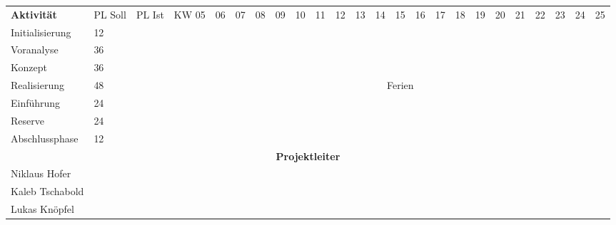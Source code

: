 \documentclass[10pt,paper=a4,final]{scrartcl}
\begin{document}
\begin{landscape}
\begin{tabularx}{\textwidth}{ |p{4.0cm}|l|l|l|l|l|l|l|l|l|l|l|l|l|l|l|l|l|l|l|l|l|l|l| }
\cline{1-24}	%
\bf Aktivit\"at & PL Soll & PL Ist & KW 05 & 06 & 07 & 08 & 09 & 10 & 11 & 12 & 13 & 14 & 15 & 16 & 17 & 18 & 19 & 20 & 21 & 22 & 23 & 24 & 25 \\
\cline{1-24}
Initialisierung & 12 & & & \cellcolor[gray]{0.7} & & & & & & & & & & & & & & & & & & & \\
\cline{1-24}
Voranalyse & 36 & & & & \cellcolor[gray]{0.7} & \cellcolor[gray]{0.7} & \cellcolor[gray]{0.7} & & & & & & & & & & & & & & & & \\
\cline{1-24}
Konzept & 36 & & & & & & & \cellcolor[gray]{0.7} & \cellcolor[gray]{0.7} & \cellcolor[gray]{0.7} & & & & & & & & & & & & & \\
\cline{1-24}
Realisierung & 48 & & & & & & & & & & \cellcolor[gray]{0.7} & \multicolumn{3}{|c|}{Ferien \cellcolor{green!70!}} & \cellcolor[gray]{0.7} & \cellcolor[gray]{0.7} & \cellcolor[gray]{0.7} & & & & & & \\
\cline{1-24}
Einf\"uhrung & 24 & & & & & & & & & & & & & & & & & \cellcolor[gray]{0.7} & \cellcolor[gray]{0.7} & & & & \\
\cline{1-24}
Reserve & 24 & & & & & & & & & & & & & & & & & & & \cellcolor[gray]{0.7} & \cellcolor[gray]{0.7} & & \\
\cline{1-24}
Abschlussphase & 12 & & & & & & & & & & & & & & & & & & & & & \cellcolor[gray]{0.7} & \cellcolor[gray]{0.7}\\
\cline{1-24}
\multicolumn{24}{|c|}{\bf Projektleiter} \\
\cline{1-24}
Niklaus Hofer & & & \cellcolor[gray]{0.7} & \cellcolor[gray]{0.7} & \cellcolor[gray]{0.7} & \cellcolor[gray]{0.7} & \cellcolor[gray]{0.7} & & & & & & & & & & & & & & & & \\
\cline{1-24}
Kaleb Tschabold & & & & & & & & \cellcolor[gray]{0.7} & \cellcolor[gray]{0.7} & \cellcolor[gray]{0.7} & \cellcolor[gray]{0.7} & \cellcolor[gray]{0.7} & \cellcolor[gray]{0.7} & \cellcolor[gray]{0.7} & \cellcolor[gray]{0.7} & & & & & & & & \\
\cline{1-24}
Lukas Kn\"opfel & & & & & & & & & & & & & & & & \cellcolor[gray]{0.7} & \cellcolor[gray]{0.7} & \cellcolor[gray]{0.7} & \cellcolor[gray]{0.7} & \cellcolor[gray]{0.7} & \cellcolor[gray]{0.7} & \cellcolor[gray]{0.7} & \cellcolor[gray]{0.7}\\
\cline{1-24}
\end{tabularx}
\end{landscape}
\end{document}
